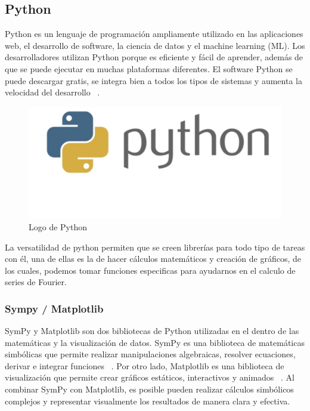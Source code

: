 \subsection{Python}
Python es un lenguaje de programación ampliamente utilizado en las aplicaciones web, el desarrollo de software, la ciencia de datos y el machine learning (ML). Los desarrolladores utilizan Python porque es eficiente y fácil de aprender, además de que se puede ejecutar en muchas plataformas diferentes. El software Python se puede descargar gratis, se integra bien a todos los tipos de sistemas y aumenta la velocidad del desarrollo ~\cite{amazonPython}.
\begin{figure}[H]
	\centering
	\includegraphics[width=\textwidth]{img/chapter02/logo_python.png}
	\caption{Logo de Python}
	\label{fig:pythonl-ogo}  %
\end{figure}
La versatilidad de python permiten que se creen librerías para todo tipo de tareas con él, una de ellas es la de hacer cálculos matemáticos y creación de gráficos, de los cuales, podemos tomar funciones especificas para ayudarnos en el calculo de series de Fourier. 

\subsubsection{Sympy / Matplotlib}
SymPy y Matplotlib son dos bibliotecas de Python utilizadas en el dentro de las matemáticas y la visualización de datos. SymPy es una biblioteca de matemáticas simbólicas que permite realizar manipulaciones algebraicas, resolver ecuaciones, derivar e integrar funciones ~\cite{sympy2024}. Por otro lado, Matplotlib es una biblioteca de visualización que permite crear gráficos estáticos, interactivos y animados ~\cite{matplotlib2024}. Al combinar SymPy con Matplotlib, es posible pueden realizar cálculos simbólicos complejos y representar visualmente los resultados de manera clara y efectiva. 
